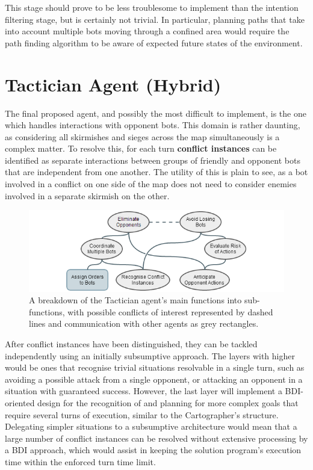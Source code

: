 \documentclass[a4paper,10pt]{article}
\begin{document}
This stage should prove to be less troublesome to implement than the intention filtering stage, but is certainly not trivial. In particular, planning paths that take into account multiple bots moving through a confined area would require the path finding algorithm to be aware of expected future states of the environment.

\section{Tactician Agent (Hybrid)}
The final proposed agent, and possibly the most difficult to implement, is the one which handles interactions with opponent bots. This domain is rather daunting, as considering all skirmishes and sieges across the map simultaneously is a complex matter. To resolve this, for each turn \textbf{conflict instances} can be identified as separate interactions between groups of friendly and opponent bots that are independent from one another. The utility of this is plain to see, as a bot involved in a conflict on one side of the map does not need to consider enemies involved in a separate skirmish on the other.

\begin{figure}[ht]
  \centering
  \includegraphics[width=0.8\linewidth]{tactician}
  \begin{minipage}[t]{0.8\textwidth}
    \caption{A breakdown of the Tactician agent's main functions into sub-functions, with possible conflicts of interest represented by dashed lines and communication with other agents as grey rectangles.}
  \end{minipage}
\end{figure}

After conflict instances have been distinguished, they can be tackled independently using an initially subsumptive approach. The layers with higher would be ones that recognise trivial situations resolvable in a single turn, such as avoiding a possible attack from a single opponent, or attacking an opponent in a situation with guaranteed success. However, the last layer will implement a BDI-oriented design for the recognition of and planning for more complex goals that require several turns of execution, similar to the Cartographer's structure. Delegating simpler situations to a subsumptive architecture would mean that a large number of conflict instances can be resolved without extensive processing by a BDI approach, which would assist in keeping the solution program's execution time within the enforced turn time limit.
\end{document}
